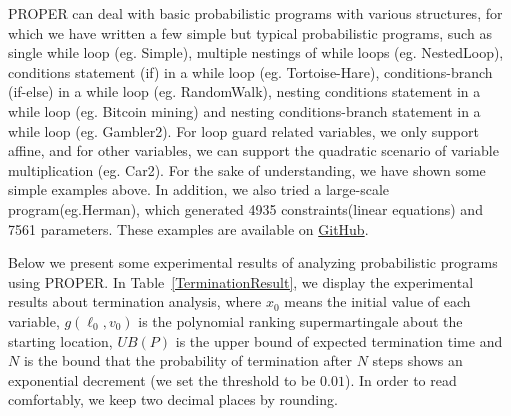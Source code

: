 \documentclass[runningheads]{llncs}
\begin{document}
PROPER can deal with basic probabilistic programs with various structures, for which we have written a few simple but typical probabilistic programs, such as single while loop (eg. Simple), multiple nestings of while loops (eg. NestedLoop), conditions statement (if) in a while loop (eg. Tortoise-Hare), conditions-branch (if-else) in a while loop (eg. RandomWalk), nesting conditions statement in a while loop (eg. Bitcoin mining) and nesting conditions-branch statement in a while loop (eg. Gambler2). For loop guard related variables, we only support affine, and for other variables, we can support the quadratic scenario of variable multiplication (eg. Car2). For the sake of understanding, we have shown some simple examples above. In addition, we also tried a large-scale program(eg.Herman), which generated 4935 constraints(linear equations) and 7561 parameters. These examples are available on \href{https://github.com/Healing1219/PROPER}{GitHub}.

Below we present some experimental results of analyzing probabilistic programs using PROPER. In Table~\ref{TerminationResult}, we display the experimental results about termination analysis, where $x_0$ means the initial value of each variable, $g(\ell_0,v_0)$ is the polynomial ranking supermartingale about the starting location, $UB(P)$ is the upper bound of expected termination time and $N$ is the bound that the probability of termination after $N$ steps shows an exponential decrement (we set the threshold to  be $0.01$). In order to read comfortably, we keep two decimal places by rounding.
\end{document}
